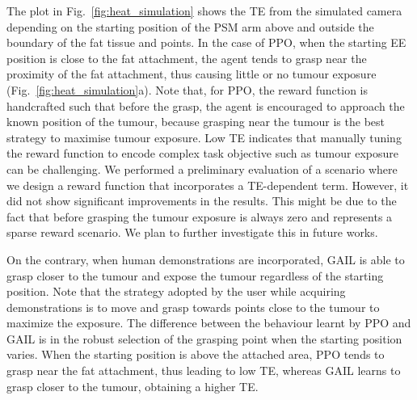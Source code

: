 \documentclass[letterpaper, 10 pt, conference]{ieeeconf}
\begin{document}
The plot in Fig.~\ref{fig:heat_simulation} shows the TE from the simulated camera depending on the starting position of the PSM arm above and outside the boundary of the fat tissue and points. In the case of PPO, when the starting EE position is close to the fat attachment, the agent tends to grasp near the proximity of the fat attachment, thus causing little or no tumour exposure (Fig.~\ref{fig:heat_simulation}a). Note that, for PPO, the reward function is handcrafted such that before the grasp, the agent is encouraged to approach the known position of the tumour, because grasping near the tumour is the best strategy to maximise tumour exposure. 
Low TE indicates that manually tuning the reward function to encode complex task objective such as tumour exposure can be challenging. We performed a preliminary evaluation of a scenario where we design a reward function that incorporates a TE-dependent term. However, it did not show significant improvements in the results.
This might be due to the fact that before grasping the tumour exposure is always zero and represents a sparse reward scenario. We plan to further investigate this in future works. 

On the contrary, when human demonstrations are incorporated, GAIL is able to grasp closer to the tumour and expose the tumour regardless of the starting position. Note that the strategy adopted by the user while acquiring demonstrations is to move and grasp towards points close to the tumour to maximize the exposure.
The difference between the behaviour learnt by PPO and GAIL is in the robust selection of the grasping point when the starting position varies. When the starting position is above the attached area, PPO tends to grasp near the fat attachment, thus leading to low TE, whereas GAIL learns to grasp closer to the tumour, obtaining a higher TE.
\end{document}
